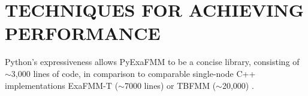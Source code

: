 \documentclass{IEEEcsmag}
\begin{document}
\section{TECHNIQUES FOR ACHIEVING PERFORMANCE}

 Python's expressiveness allows PyExaFMM to be a concise library, consisting of $\sim$3,000 lines of code, in comparison to comparable single-node C++ implementations ExaFMM-T ($\sim$7000 lines) \cite{Wang2021} or TBFMM ($\sim$20,000) \cite{Bramas2020}.





\end{document}
